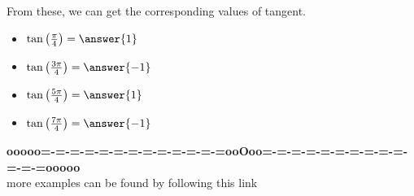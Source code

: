 \documentclass{ximera}
\begin{document}
From these, we can get the corresponding values of tangent.



\begin{question}



\begin{itemize}
\item $\tan\left(\frac{\pi}{4}\right) = \answer{1}$ \\
\item $\tan\left(\frac{3\pi}{4}\right) = \answer{-1}$ \\
\item $\tan\left(\frac{5\pi}{4}\right) = \answer{1}$ \\
\item $\tan\left(\frac{7\pi}{4}\right) = \answer{-1}$ \\
\end{itemize}



\end{question}














\begin{center}
\textbf{\textcolor{green!50!black}{ooooo=-=-=-=-=-=-=-=-=-=-=-=-=ooOoo=-=-=-=-=-=-=-=-=-=-=-=-=ooooo}} \\

more examples can be found by following this link\\ 

\end{center}
\end{document}
